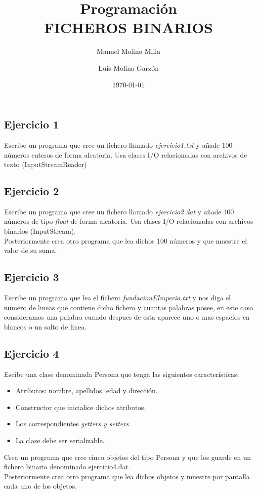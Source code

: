 \documentclass[a4paper,spanish]{article}
\author{Manuel Molino Milla \and Luis Molina Garzón}
\title{\textbf{Programación}
\\FICHEROS BINARIOS}
\date{\today}
\begin{document}
\maketitle

\subsection*{Ejercicio 1}
Escribe un programa que cree un fichero llamado \emph{ejercicio1.txt}  y  añade 100 números enteros de forma aleatoria. Usa clases I/O relacionadas con archivos de texto (InputStreamReader)

\subsection*{Ejercicio 2}
Escribe un programa que cree un fichero llamado \emph{ejercicio2.dat} y  añade 100 números de tipo \emph{float} de forma aleatoria. Usa clases I/O relacionadas con archivos binarios (InputStream).\\
Posteriormente crea otro programa que lea dichos 100 números y que muestre el valor de su suma.

\subsection*{Ejercicio 3}
Escribe un programa que lea el fichero \emph{fundacionEImperio.txt} y nos diga el numero de lineas que contiene dicho fichero y cuantas palabras posee, en este caso consideramos una palabra cuando despues de esta aparece uno o mas espacios en blancos o un salto de linea.

\subsection*{Ejercicio 4}
Escibe una clase denominada Persona que tenga las siguientes características:
\begin{itemize}
\item Atributos: nombre, apellidos, edad y dirección.
\item Constructor que inicialice dichos atributos.
\item Los correspondientes \emph{getters y setters}
\item La clase debe ser serializable.
\end{itemize}
Crea un programa que cree cinco objetos del tipo Persona y que los guarde en un fichero binario denominado ejercicio4.dat.\\
Posteriormente crea otro programa que lea dichos objetos y muestre por pantalla cada uno de los objetos.
\end{document}
